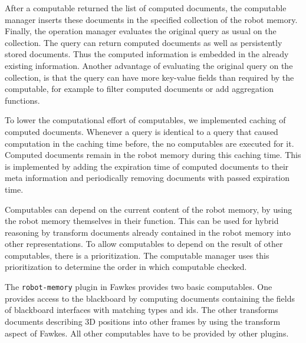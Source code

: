 After a computable returned the list of computed documents, the
computable manager inserts these documents in the specified collection
of the robot memory. Finally, the operation manager evaluates the
original query as usual on the collection. The query can return computed
documents as well as persistently stored documents. Thus the computed
information is embedded in the already existing information. Another
advantage of evaluating the original query on the collection, is that
the query can have more key-value fields than required by the
computable, for example to filter computed documents or add
aggregation functions.

To lower the computational effort of computables, we implemented
caching of computed documents. Whenever a query is identical to a
query that caused computation in the caching time before, the no
computables are executed for it. Computed documents remain in the
robot memory during this caching time. This is implemented by adding
the expiration time of computed documents to their meta information
and periodically removing documents with passed expiration time.

Computables can depend on the current content of the robot memory, by
using the robot memory themselves in their function. This can be used
for hybrid reasoning by transform documents already contained in the
robot memory into other representations. To allow computables to
depend on the result of other computables, there is a
prioritization. The computable manager uses this prioritization to
determine the order in which computable checked.

The \texttt{robot-memory} plugin in Fawkes provides two basic
computables. One provides access to the blackboard by computing
documents containing the fields of blackboard interfaces with matching
types and ids. The other transforms documents describing 3D positions
into other frames by using the transform aspect of Fawkes. All other
computables have to be provided by other plugins.

